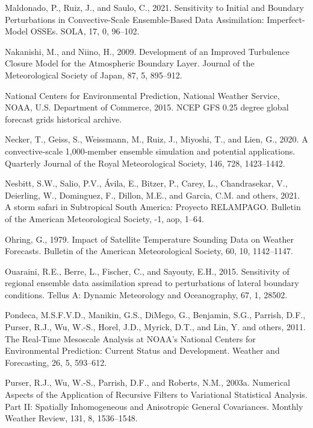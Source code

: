 \documentclass[12pt,twoside]{reedthesis}
\begin{document}
\leavevmode\hypertarget{ref-maldonado2021}{}%
Maldonado, P., Ruiz, J., and Saulo, C., 2021. Sensitivity to Initial and Boundary Perturbations in Convective-Scale Ensemble-Based Data Assimilation: Imperfect-Model OSSEs. SOLA, 17, 0, 96--102.

\leavevmode\hypertarget{ref-nakanishi2009}{}%
Nakanishi, M., and Niino, H., 2009. Development of an Improved Turbulence Closure Model for the Atmospheric Boundary Layer. Journal of the Meteorological Society of Japan, 87, 5, 895--912.

\leavevmode\hypertarget{ref-cisl_rda_ds084.1}{}%
National Centers for Environmental Prediction, National Weather Service, NOAA, U.S. Department of Commerce, 2015. NCEP GFS 0.25 degree global forecast grids historical archive.

\leavevmode\hypertarget{ref-necker2020}{}%
Necker, T., Geiss, S., Weissmann, M., Ruiz, J., Miyoshi, T., and Lien, G., 2020. A convective‐scale 1,000‐member ensemble simulation and potential applications. Quarterly Journal of the Royal Meteorological Society, 146, 728, 1423--1442.

\leavevmode\hypertarget{ref-nesbitt2021}{}%
Nesbitt, S.W., Salio, P.V., Ávila, E., Bitzer, P., Carey, L., Chandrasekar, V., Deierling, W., Dominguez, F., Dillon, M.E., and Garcia, C.M. and others, 2021. A storm safari in Subtropical South America: Proyecto RELAMPAGO. Bulletin of the American Meteorological Society, -1, aop, 1--64.

\leavevmode\hypertarget{ref-ohring1979}{}%
Ohring, G., 1979. Impact of Satellite Temperature Sounding Data on Weather Forecasts. Bulletin of the American Meteorological Society, 60, 10, 1142--1147.

\leavevmode\hypertarget{ref-ouaraini2015}{}%
Ouaraini, R.E., Berre, L., Fischer, C., and Sayouty, E.H., 2015. Sensitivity of regional ensemble data assimilation spread to perturbations of lateral boundary conditions. Tellus A: Dynamic Meteorology and Oceanography, 67, 1, 28502.

\leavevmode\hypertarget{ref-pondeca2011}{}%
Pondeca, M.S.F.V.D., Manikin, G.S., DiMego, G., Benjamin, S.G., Parrish, D.F., Purser, R.J., Wu, W.-S., Horel, J.D., Myrick, D.T., and Lin, Y. and others, 2011. The Real-Time Mesoscale Analysis at NOAA's National Centers for Environmental Prediction: Current Status and Development. Weather and Forecasting, 26, 5, 593--612.

\leavevmode\hypertarget{ref-purser2003a}{}%
Purser, R.J., Wu, W.-S., Parrish, D.F., and Roberts, N.M., 2003a. Numerical Aspects of the Application of Recursive Filters to Variational Statistical Analysis. Part II: Spatially Inhomogeneous and Anisotropic General Covariances. Monthly Weather Review, 131, 8, 1536--1548.
\end{document}
